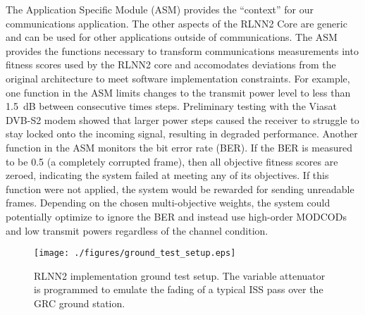 \documentclass[journal]{IEEEtran}
\let\MYoriglatexcaption\caption
\renewcommand{\caption}[2][\relax]{\MYoriglatexcaption[#2]{#2}}
\begin{document}
The Application Specific Module (ASM) provides the ``context'' for our communications application.  The other aspects of the RLNN2 Core are generic and can be used for other applications outside of communications.  The ASM provides the functions necessary to transform communications measurements into fitness scores used by the RLNN2 core and accomodates deviations from the original architecture \cite{paulo-jrnl} to meet  software implementation constraints.  For example, one function in the ASM limits changes to the transmit power level to less than 1.5~dB between consecutive times steps.  Preliminary testing with the Viasat DVB-S2 modem showed that larger power steps caused the receiver to struggle to stay locked onto the incoming signal, resulting in degraded performance.  Another function in the ASM monitors the bit error rate (BER).  If the BER is measured to be 0.5 (a completely corrupted frame), then all objective fitness scores are zeroed, indicating the system failed at meeting any of its objectives.  If this function were not applied, the system would be rewarded for sending unreadable frames.  Depending on the chosen multi-objective weights, the system could potentially optimize to ignore the BER and instead use high-order MODCODs and low transmit powers regardless of the channel condition.

\begin{figure*}[t]
	\centering
 	\texttt{[image: ./figures/ground\_test\_setup.eps]}
 	\caption{RLNN2 implementation ground test setup.  The variable attenuator is programmed to emulate the fading of a typical ISS pass over the GRC ground station.}
 	\label{fig:ground_test_setup}
\end{figure*}
\end{document}
